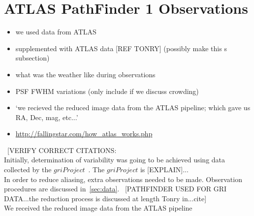 \documentclass[aps,prb,twocolumn,superscriptaddress]{revtex4-1}
\begin{document}
\section{ATLAS PathFinder 1 Observations}
\begin{itemize}
	\item{} we used data from ATLAS
	\item{} supplemented with ATLAS data [REF TONRY] (possibly make this s subsection)
	\item{} what was the weather like during observations
	\item{} PSF FWHM variations (only include if we discuss crowding)
	\item{} `we recieved the reduced image data from the ATLAS pipeline; which gave us RA, Dec, mag, etc...'
	\item{}\url{http://fallingstar.com/how_atlas_works.php}
\end{itemize}


~[VERIFY CORRECT CITATIONS:\\%
Initially, determination of variability was going to be achieved using data collected by the $gri Project$~\cite{gri}.  The $gri Project$ is [EXPLAIN]...\\
In order to reduce aliasing, extra observations needed to be made.  Observation procedures are discussed in~\cref{sec:data}.
~[PATHFINDER USED FOR GRI DATA...the reduction process is discussed at length Tonry in...cite]\\
We received the reduced image data from the ATLAS pipeline~\cite{gri}~\cite{tonrypipe}
\end{document}
